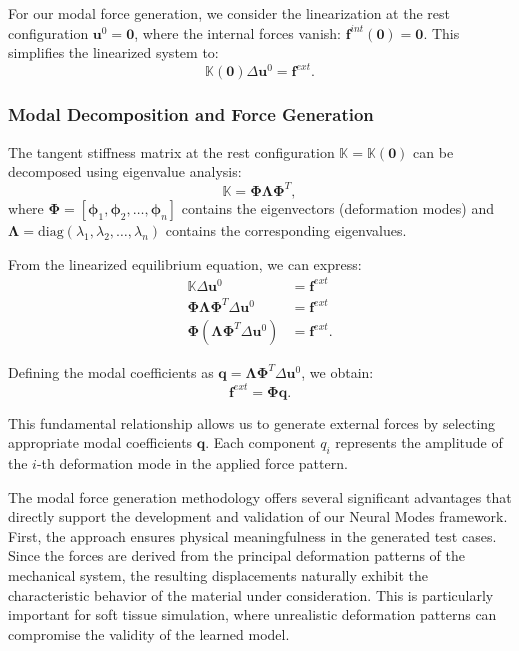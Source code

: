 For our modal force generation, we consider the linearization at the rest configuration $\bm{u}^0 = \bm{0}$, where the internal forces vanish: $\bm{f}^{int}(\bm{0}) = \bm{0}$. This simplifies the linearized system to:
\begin{equation}
    \mathbb{K}(\bm{0}) \Delta\bm{u}^0 = \bm{f}^{ext}.
\end{equation}

\subsubsection{Modal Decomposition and Force Generation}

The tangent stiffness matrix at the rest configuration $\mathbb{K} = \mathbb{K}(\bm{0})$ can be decomposed using eigenvalue analysis:
\begin{equation}
    \mathbb{K} = \boldsymbol{\Phi} \boldsymbol{\Lambda} \boldsymbol{\Phi}^T,
\end{equation}
where $\boldsymbol{\Phi} = [\bm{\phi}_1, \bm{\phi}_2, \ldots, \bm{\phi}_n]$ contains the eigenvectors (deformation modes) and $\boldsymbol{\Lambda} = \text{diag}(\lambda_1, \lambda_2, \ldots, \lambda_n)$ contains the corresponding eigenvalues.

From the linearized equilibrium equation, we can express:
\begin{align}
    \mathbb{K} \Delta\bm{u}^0 &= \bm{f}^{ext} \\
    \boldsymbol{\Phi} \boldsymbol{\Lambda} \boldsymbol{\Phi}^T \Delta\bm{u}^0 &= \bm{f}^{ext} \\
    \boldsymbol{\Phi} (\boldsymbol{\Lambda} \boldsymbol{\Phi}^T \Delta\bm{u}^0) &= \bm{f}^{ext}.
\end{align}

Defining the modal coefficients as $\bm{q} = \boldsymbol{\Lambda} \boldsymbol{\Phi}^T \Delta\bm{u}^0$, we obtain:
\begin{equation}
    \bm{f}^{ext} = \boldsymbol{\Phi} \bm{q}.
\end{equation}

This fundamental relationship allows us to generate external forces by selecting appropriate modal coefficients $\bm{q}$. Each component $q_i$ represents the amplitude of the $i$-th deformation mode in the applied force pattern.


The modal force generation methodology offers several significant advantages that directly support the development and validation of our Neural Modes framework. First, the approach ensures physical meaningfulness in the generated test cases. Since the forces are derived from the principal deformation patterns of the mechanical system, the resulting displacements naturally exhibit the characteristic behavior of the material under consideration. This is particularly important for soft tissue simulation, where unrealistic deformation patterns can compromise the validity of the learned model.

